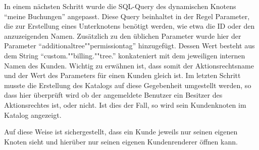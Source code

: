 In einem nächsten Schritt wurde die SQL-Query des dynamischen Knotens "`meine Buchungen"' angepasst.
Diese Query beinhaltet in der Regel Parameter, die zur Erstellung eines Unterknotens benötigt werden, wie etwa die ID oder den anzuzeigenden Namen.
Zusätzlich zu den üblichen Parameter wurde hier der Parameter "`additionaltree""permissiontag"' hinzugefügt.
Dessen Wert besteht aus dem String "`custom.""billing.""tree."' konkateniert mit dem jeweiligen internen Namen des Kunden.
Wichtig zu erwähnen ist, dass somit der Aktionsrechtsname und der Wert des Parameters für einen Kunden gleich ist. 
Im letzten Schritt musste die Erstellung des Katalogs auf diese Gegebenheit umgestellt werden, so dass hier überprüft wird ob der angemeldete Benutzer ein Besitzer des Aktionsrechtes ist, oder nicht.
Ist dies der Fall, so wird sein Kundenknoten im Katalog angezeigt.

Auf diese Weise ist sichergestellt, dass ein Kunde jeweils nur seinen eigenen Knoten sieht und hierüber nur seinen eigenen Kundenrenderer öffnen kann. 




